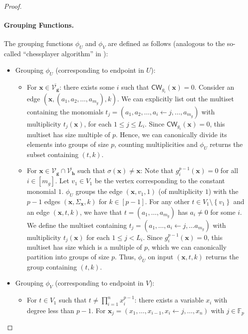 \documentclass[10pt,a4paper]{article}
\theoremstyle{definition}
\theoremstyle{remark}
\def\set#1{\left\{#1\right\}}
\newcommand{\bbF}{\ensuremath{\mathbb{F}}}
\newcommand{\calV}{\mathcal{V}}
\newcommand{\vecg}{\ensuremath{\boldsymbol{g}}}
\newcommand{\vech}{\ensuremath{\boldsymbol{h}}}
\newcommand{\vecx}{\ensuremath{\boldsymbol{x}}}
\newcommand{\CW}{\mathsf{CW}}
\providecommand{\bracks}[1]{\left[#1\right]}
\begin{document}
\begin{proof}
 \paragraph{Grouping Functions.}
      The grouping functions $\phi_U$ and $\phi_V$ are defined as follows (analogous to the so-called ``chessplayer algorithm'' in \cite{r33}):
 \begin{itemize}[label=$\triangleright$,leftmargin=0.5cm]
	\item Grouping $\phi_U$ (corresponding to endpoint in $U$):
\begin{itemize}[leftmargin=0.25cm]
		\item For $\vecx \in \overline{\calV_{\vecg}}$: there exists some $i$ such
		that $\CW_{g_i}(\vecx) = 0$. Consider an edge
		$(\vecx,(a_1,a_2, \dots, a_{m_g}),k)$. We can explicitly list out the multiset containing the monomials
		$t_j = (a_1,a_2, \dots, a_i \gets j, \dots, a_{m_g})$ with multiplicity
	        $t_j(\vecx)$, for each $1 \le j \le L_i$. Since $\CW_{g_i}(\vecx) = 0$, this multiset has size
		multiple of $p$. Hence, we can canonically divide its elements into groups of
		size $p$, counting multiplicities and $\phi_U$ returns the subset containing $(t,k)$.
		\item For $\vecx \in \calV_{\vecg} \cap \overline{\calV_{\vech}}$ such that $\sigma(\vecx) \ne \vecx$: Note that $g_{i}^{p-1}(\vecx) = 0$ for all $i \in \bracks{m_g}$.
		Let $v_1 \in V_1$ be the vertex corresponding to the
		constant monomial $1$. $\phi_U$ groups the edge $(\vecx, v_1, 1)$ (of multiplicity $1$) with the $p-1$ edges $(\vecx, \Sigma_{\vecx}, k)$ for $k \in [p-1]$.
		For any other $t \in  V_1 \setminus \set{v_1}$ and an edge $(\vecx, t,k)$, we have that
		$t = (a_1,\dots, a_{m_g})$ has $a_i \ne 0$ for some $i$. We define
		the multiset containing $t_j = (a_1, \dots, a_{i} \gets j, \dots a_{m_g})$
		with multiplicity $t_j(\vecx)$ for each $1 \le j < L_i$. Since
		$g_{i}^{p-1}(\vecx) = 0$, this multiset has size which is a multiple of $p$, which we can canonically partition into groups of size $p$. Thus, $\phi_U$ on input
		$(\vecx, t, k)$ returns the group containing $(t,k)$.
 	\end{itemize}
	\item Grouping $\phi_V$ (corresponding to endpoint in $V$):
		\begin{itemize}[leftmargin=0.25cm]
		\item For $t \in V_1$ such that $t \neq \prod\limits_{i = 1}^n x_i^{p-1}$:
		there exists a variable $x_i$ with degree less than $p-1$. For
		$\vecx_j = (x_1, \dots, x_{i-1}, x_i \gets j, \dots, x_n)$ with $j \in \bbF_p$

\end{itemize}
\end{itemize}
\end{proof}
\end{document}
